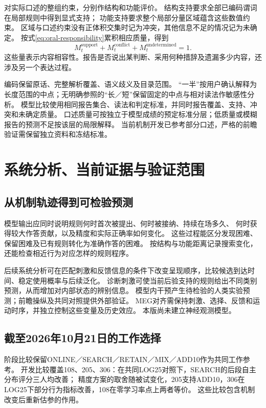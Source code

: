 \documentclass[11pt,a4paper]{article}
\numberwithin{equation}{section}
\begin{document}
对实际口述的整组约束，分别作结构和功能评价。
结构支持要求全部已编码谓词在局部规则中得到显式支持；
功能支持要求整个局部分量区域蕴含这些数值约束。
区域与口述约束没有正体积交集时记为冲突，其他信息不足的情况记为未确定。
按式\eqref{eq:oral-responsibility}累积相应质量，得到
\begin{equation}
M_t^{\mathrm{support}}+M_t^{\mathrm{conflict}}+M_t^{\mathrm{undetermined}}=1.
\end{equation}
这些量表示内容相容性。报告是否说出某判断、采用何种措辞及遗漏多少内容，还涉及另一个表达过程。

编码保留原话、完整解析覆盖、语义歧义及目录范围。
“一半”按用户确认解释为长度范围的中点；无明确参照的“长／短”保留固定的中点与相对读法作敏感性分析。
模型比较使用相同报告集合、读法和判定标准，并同时报告覆盖、支持、冲突和未确定质量。
口述质量可按独立于模型成绩的预定标准分层；低质量或模糊报告的预测不足按该层的局限解释。
当前机制开发已参考部分口述，严格的前瞻验证需保留独立资料和冻结标准。

\section{系统分析、当前证据与验证范围}
\label{sec:validation}

\subsection{从机制轨迹得到可检验预测}
模型输出应同时说明规则何时首次被提出、何时被接纳、持续在场多久、
何时获得较大作答贡献，以及精度和实际正确率如何变化。
这些过程能区分发现困难、保留困难及已有规则转化为准确作答的困难。
按结构与功能距离记录搜索变化，还能检查相近行为对应怎样的规则程序。

后续系统分析可在匹配刺激和反馈信息的条件下改变呈现顺序，比较候选到达时间、稳定使用概率与后续泛化。
诊断刺激可使当前后验支持的规则给出不同类别预测，从而增加对内部状态的辨别信息。
模型内干预产生待检验的人类实验预测；前瞻操纵及共同对照提供外部验证。
MEG对齐需保持刺激、选择、反馈和运动时序，并独立控制这些变量及历史效应。
本版尚未建立神经观测模型。

\subsection{截至2026年10月21日的工作选择}
阶段比较保留ONLINE／SEARCH／RETAIN／MIX／ADD10作为共同工作参考。
开发比较覆盖108、205、306：在共同LOG25对照下，SEARCH的后段自主分布评分三人均改善；
精度方案的取舍随被试变化，205支持ADD10，306在LOG25下部分行为指标改善，108在零学习率点上两者等价。
这些比较包含机制改变后重新估参的作用。
\end{document}
